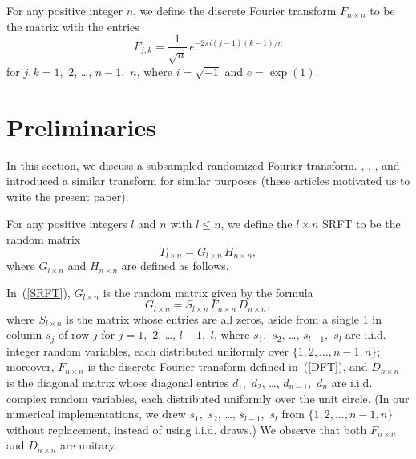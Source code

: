 \documentclass[letterpaper,12pt]{article}
\begin{document}
For any positive integer $n$,
we define the discrete Fourier transform $F_{n \times n}$ to be the matrix
with the entries
\begin{equation}
\label{DFT}
F_{j,k} = \frac{1}{\sqrt{n}} \, e^{-2 \pi i (j-1) (k-1)/n}
\end{equation}
for $j,k = 1$,~$2$, \dots, $n-1$,~$n$, where $i = \sqrt{-1}$ and $e = \exp(1)$.



\section{Preliminaries}
\label{prelims}

In this section, we discuss a subsampled randomized Fourier transform.
\cite{ailon-chazelle}, \cite{drineas-mahoney-muthukrishnan-sarlos},
\cite{sarlos3}, and~\cite{sarlos4} introduced a similar transform
for similar purposes (these articles motivated us to write the present paper).

For any positive integers $l$ and $n$ with $l \le n$,
we define the $l \times n$ SRFT to be the random matrix
\begin{equation}
\label{SRFT}
T_{l \times n} = G_{l \times n} \, H_{n \times n},
\end{equation}
where $G_{l \times n}$ and $H_{n \times n}$ are defined as follows.

In~(\ref{SRFT}), $G_{l \times n}$ is the random matrix given by the formula
\begin{equation}
\label{SRFT2}
G_{l \times n} = S_{l \times n} \, F_{n \times n} \, D_{n \times n},
\end{equation}
where $S_{l \times n}$ is the matrix whose entries are all zeros,
aside from a single 1 in column $s_j$ of row $j$
for $j = 1$,~$2$, \dots, $l-1$,~$l$,
where $s_1$,~$s_2$, \dots, $s_{l-1}$,~$s_l$ are
i.i.d. integer random variables,
each distributed uniformly over $\{1, 2, \dots, n-1, n\}$;
moreover, $F_{n \times n}$ is the discrete Fourier transform
defined in~(\ref{DFT}),
and $D_{n \times n}$ is the diagonal matrix whose diagonal entries
$d_1$,~$d_2$, \dots, $d_{n-1}$,~$d_n$ are i.i.d. complex random variables,
each distributed uniformly over the unit circle.
(In our numerical implementations,
we drew $s_1$,~$s_2$, \dots, $s_{l-1}$,~$s_l$
from $\{1, 2, \dots, n-1, n\}$ without replacement,
instead of using i.i.d. draws.)
We observe that both $F_{n \times n}$ and $D_{n \times n}$ are unitary.
\end{document}
